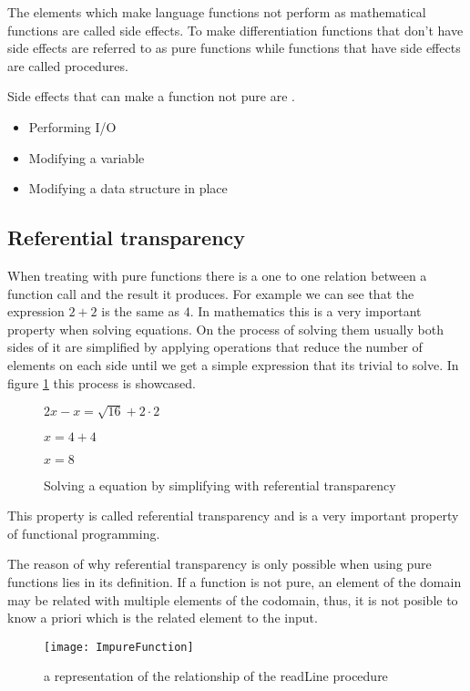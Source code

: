 \documentclass[../main.tex]{subfiles}
\begin{document}
The elements which make language functions not perform as mathematical functions
are called side effects. To make differentiation functions that don't have side
effects are referred to as pure functions\autocite{UsingAttributes} while
functions that have side effects are called procedures.

Side effects that can make a function not pure are
\autocite{SpulerCompilerEffects}.

\begin{itemize}
  \item Performing I/O
  \item Modifying a variable
  \item Modifying a data structure in place
\end{itemize}

\subsection{Referential transparency} When treating with pure functions there is
a one to one relation between a function call and the result it produces. For
example we can see that the expression $2 + 2$ is the same as $4$. In
mathematics this is a very important property when solving equations. On the
process of solving them usually both sides of it are simplified by applying
operations that reduce the number of elements on each side until we get a simple
expression that its trivial to solve. In figure \ref{fig:refequation} this
process is showcased.

\begin{figure}[ht]
  \centering
  $ 2x - x = \sqrt{16} + 2 \cdot 2$

  $ x = 4 + 4$

  $ x = 8 $
  \caption{\label{fig:refequation} Solving a equation by simplifying with
    referential transparency}
\end{figure}


This property is called referential transparency
\autocite{Strachey2000FundamentalLanguages} and is a very important property of
functional programming.

The reason of why referential transparency is only possible when using pure
functions lies in its definition. If a function is not pure, an element of the
domain may be related with multiple elements of the codomain, thus, it is not
posible to know a priori which is the related element to the input.

\begin{figure}[ht]
  \centering \texttt{[image: ImpureFunction]}
  \caption{\label{fig:impurefunction} a representation of the relationship of
    the readLine procedure}
\end{figure}
\end{document}
